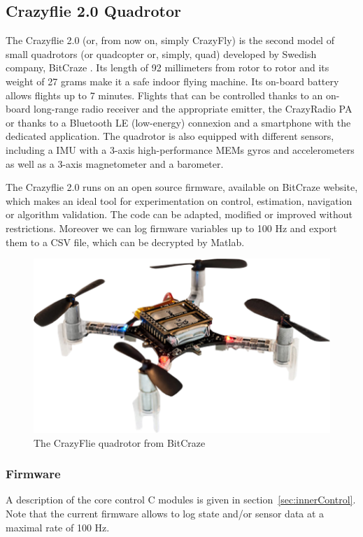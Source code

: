 \documentclass[a4paper, 12pt]{report}
\begin{document}
\subsection{Crazyflie 2.0 Quadrotor}
The Crazyflie 2.0 (or, from now on, simply CrazyFly) is the second model of small quadrotors (or quadcopter or, simply, quad) developed by Swedish company, BitCraze \cite{bitcraze}. Its length of 92 millimeters from rotor to rotor and its weight of 27 grams make it a safe indoor flying machine. Its on-board battery allows flights up to 7 minutes. Flights that can be controlled thanks to an on-board long-range radio receiver and the appropriate emitter, the CrazyRadio PA or thanks to a Bluetooth LE (low-energy) connexion and a smartphone with the dedicated application. The quadrotor is also equipped with different sensors, including a IMU with a 3-axis high-performance MEMs gyros and accelerometers as well as a 3-axis magnetometer and a barometer.

The Crazyflie 2.0 runs on an open source firmware, available on BitCraze website\cite{bitcraze}, which makes an ideal tool for experimentation on control, estimation, navigation or algorithm validation. The code can be adapted, modified or improved without restrictions. Moreover we can log firmware variables up to 100 Hz and export them to a CSV file, which can be decrypted by Matlab.

\begin{figure}[htbp]
\centering
\includegraphics[width=.4\textwidth]{Images/crazyflie}
\captionsetup[subfloat]{labelformat=empty}
\caption{The CrazyFlie quadrotor from BitCraze}
\label{fig:cf}
\end{figure}

\subsubsection{Firmware}
A description of the core control C modules is given in section~\ref{sec:innerControl}. Note that the current firmware allows to log state and/or sensor data at a maximal rate of 100 Hz.
\end{document}
